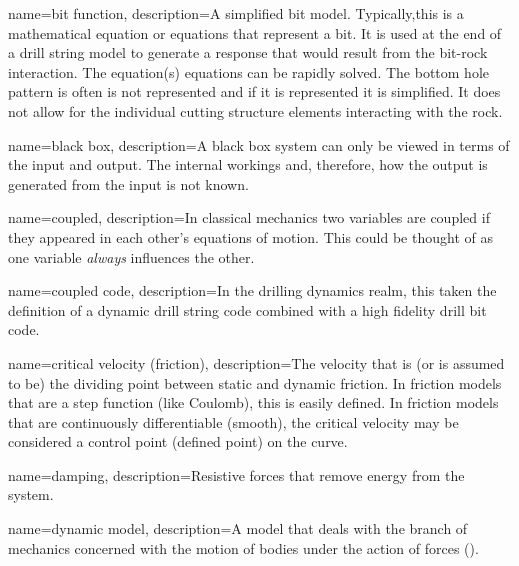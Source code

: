 
\newcommand*{\comma}{,}


{
	name=bit function,
	description=A simplified bit model.  Typically\comma this is a mathematical equation or equations that represent a bit.  It is used at the end of a drill string model to generate a response that would result from the bit-rock interaction.  The equation(s) equations can be rapidly solved.  The bottom hole pattern is often is not represented and if it is represented it is simplified.  It does not allow for the individual cutting structure elements interacting with the rock.
}

{
	name=black box,
	description={A black box system can only be viewed in terms of the input and output.  The internal workings and, therefore, how the output is generated from the input is not known.}
}

{
	name=coupled,
	description=In classical mechanics two variables are coupled if they appeared in each other's equations of motion.  This could be thought of as one variable \textit{always} influences the other.
}

{
	name=coupled code,
	description=In the drilling dynamics realm\comma{} this taken the definition of a dynamic drill string code combined with a high fidelity drill bit code.
}

{
	name=critical velocity (friction),
    description=The velocity that is (or is assumed to be) the dividing point between static and dynamic friction.  In friction models that are a step function (like Coulomb)\comma{} this is easily defined.  In friction models that are continuously differentiable (smooth)\comma{} the critical velocity may be considered a control point (defined point) on the curve.
}

{
	name=damping,
	description=Resistive forces that remove energy from the system.
}

{
	name=dynamic model,
	description=A model that deals with the branch of mechanics concerned with the motion of bodies under the action of forces (\dynamicforcebalance).
}

